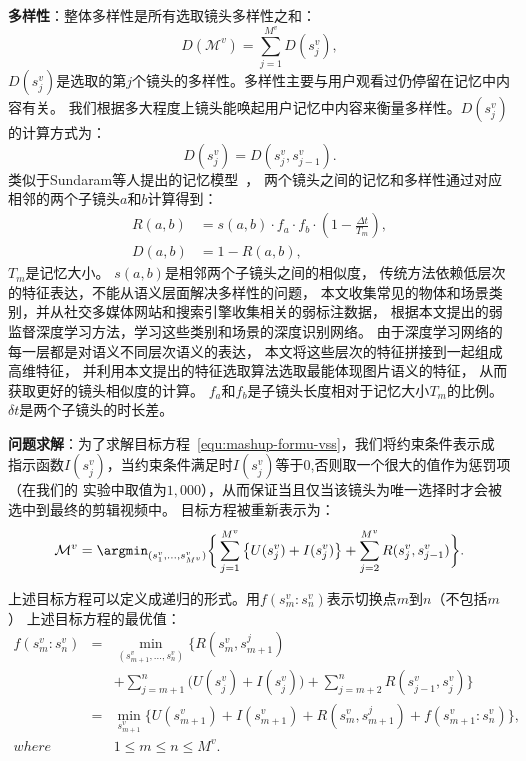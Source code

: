 \textbf{多样性}：整体多样性是所有选取镜头多样性之和：
\begin{equation}
	D(\mathcal{M}^v) = \sum_{j=1}^{M^v}{D(s_j^v)},
\end{equation}
$D(s_j^v)$是选取的第$j$个镜头的多样性。多样性主要与用户观看过仍停留在记忆中内容有关。
我们根据多大程度上镜头能唤起用户记忆中内容来衡量多样性。$D(s_j^v)$的计算方式为：
\begin{equation}
	D(s_j^v) = D(s_j^v, s_{j-1}^v).
\end{equation}
类似于Sundaram等人提出的记忆模型~\cite{sundaram2002computable}，
两个镜头之间的记忆和多样性通过对应相邻的两个子镜头$a$和$b$计算得到：
\begin{equation}
	\begin{aligned}
		R(a,b) &= s(a,b)\cdot f_a \cdot f_b \cdot (1- \frac{\Delta t}{T_m} ), \\
		D(a,b) &= 1 - R(a,b),
	\end{aligned}
\end{equation}
$T_m$是记忆大小。 $s(a,b)$是相邻两个子镜头之间的相似度，
传统方法依赖低层次的特征表达，不能从语义层面解决多样性的问题，
本文收集常见的物体和场景类别，并从社交多媒体网站和搜索引擎收集相关的弱标注数据，
根据本文提出的弱监督深度学习方法，学习这些类别和场景的深度识别网络。
由于深度学习网络的每一层都是对语义不同层次语义的表达，
本文将这些层次的特征拼接到一起组成高维特征，
并利用本文提出的特征选取算法选取最能体现图片语义的特征，
从而获取更好的镜头相似度的计算。
$f_a$和$f_b$是子镜头长度相对于记忆大小$T_m$的比例。$\delta t$是两个子镜头的时长差。

\textbf{问题求解}：为了求解目标方程~\eqref{equ:mashup-formu-vss}，我们将约束条件表示成
指示函数$I(s_j^v)$，当约束条件满足时$I(s_j^v)$等于0,否则取一个很大的值作为惩罚项（在我们的
实验中取值为$1,000$），从而保证当且仅当该镜头为唯一选择时才会被选中到最终的剪辑视频中。
目标方程被重新表示为：
\begin{equation}
	\mathcal{M}^v = \argmin_{(s_1^v, \ldots, s_{M^v}^v)}
	\bigg\{ \sum_{j=1}^{M^v}{\big\{U(s_j^v) + I(s_j^v)\big\}}
	+  \sum_{j=2}^{M^v}{R(s_j^v, s_{j-1}^v)} \bigg \}.
	\label{equ:mashup-reformu-vss}
\end{equation}

上述目标方程可以定义成递归的形式。用$f(s_m^v:s_n^v)$表示切换点$m$到$n$（不包括$m$）
上述目标方程的最优值：
\begin{eqnarray}
    f(s_m^v:s_n^v) &=& \min_{(s_{m+1}^v, \ldots, s_{n}^v)}\bigg\{ R(s_{m}^v,
        s_{m + 1}^j) \nonumber \\
        &&+ \sum_{j=m + 1}^{n}{\Big( U(s_j^v) +I(s_j^v)\Big)}
		+ \sum_{j = m + 2}^{n}{R(s_{j - 1}^v, s_{j}^v)} \bigg\}  \nonumber \\
		&=& \min_{s_{m+1}^v}\bigg\{U(s_{m+1}^v) + I(s_{m+1}^v)
		+ R(s_{m}^v, s_{m + 1}^j)
		+f(s_{m+1}^v:s_n^v)\bigg\}, \nonumber \\
		where&& 1\leq m \leq n \leq M^v.
	\label{equ:mashup-recur-vss}
\end{eqnarray}

